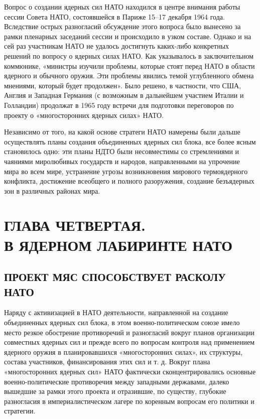 \documentclass[12pt, a4paper, openany]{book}
\begin{document}
		Вопрос о создании ядерных сил НАТО находился в центре внимания работы сессии Совета НАТО, состоявшейся в Париже 15–17 декабря 1964 года. Вследствие острых разногласий обсуждение этого вопроса было вынесено за рамки пленарных заседаний сессии и происходило в узком составе. Однако и на сей раз участникам НАТО не удалось достигнуть каких-либо конкретных решений по вопросу о ядерных силах НАТО. Как указывалось в заключительном коммюнике, «министры изучили проблемы, которые стоят перед НАТО в области ядерного и обычного оружия. Эти проблемы явились темой углубленного обмена мнениями, который будет продолжен». Было решено, в частности, что США, Англия и Западная Германия (с возможным в дальнейшем участием Италии и Голландии) продолжат в 1965 году встречи для подготовки переговоров по проекту о «многосторонних ядерных силах» НАТО.
		
		Независимо от того, на какой основе стратеги НАТО намерены были дальше осуществлять планы создания объединенных ядерных сил блока, все более ясным становилось одно: эти планы НДТО были несовместимы со стремлениями и чаяниями миролюбивых государств и народов, направленными на упрочение мира во всем мире, устранение угрозы возникновения мирового термоядерного конфликта, достижение всеобщего и полного разоружения, создание безъядерных зон в различных районах мира.
		
		\newpage
		\section[Глава четвертая. В ЯДЕРНОМ ЛАБИРИНТЕ НАТО]{\center ГЛАВА ЧЕТВЕРТАЯ.\\ \textbf{В ЯДЕРНОМ ЛАБИРИНТЕ НАТО}}	
		\subsection[Проект МЯС способствует расколу НАТО]{\center ПРОЕКТ МЯС СПОСОБСТВУЕТ РАСКОЛУ НАТО}	
		
		Наряду с активизацией в НАТО деятельности, направленной на создание объединенных ядерных сил блока, в этом военно-политическом союзе имело место резкое обострение противоречий и разногласий вокруг планов организации совместных ядерных сил и прежде всего по вопросам контроля над применением ядерного оружия в планировавшихся «многосторонних силах», их структуры, состава участников, финансирования этих сил и т. д. Вокруг плана «многосторонних ядерных сил» НАТО фактически сконцентрировались основные военно-политические противоречия между западными державами, далеко вышедшие за рамки этого проекта и отразившие, по существу, глубокие разногласия в империалистическом лагере по коренным вопросам его политики и стратегии.
		
\end{document}
